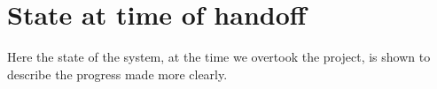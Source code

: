 \chapter{State at time of handoff}\label{app:state-at-handoff}

Here the state of the system, at the time we overtook the project, is shown to describe the progress made more clearly.



